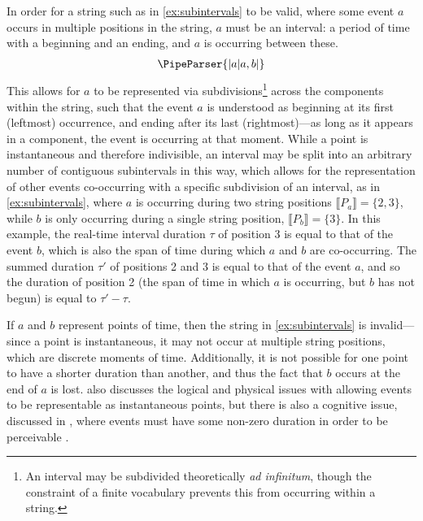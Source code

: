 \documentclass[a4paper,12pt,leqno]{article}
\newcommand{\vph}[1]{\vphantom{#1}}
\newcommand{\ebox}[1]{\fbox{$\vph{'(),}#1$}}
\newcommand{\EventString}[1]{%
	\renewcommand*{\do}[1]{\ebox{##1}}%
	\PipeParser{#1}%
}
\begin{document}
In order for a string such as in \cref{ex:subintervals} to be valid, where some event $a$ occurs in multiple positions in the string, $a$ must be an interval: a period of time with a beginning and an ending, and $a$ is occurring between these.
\begin{align}\label{ex:subintervals}
	\EventString{{}|a|a,b|{}}
\end{align}
This allows for $a$ to be represented via subdivisions\footnote{An interval may be subdivided theoretically \textit{ad infinitum}, though the constraint of a finite vocabulary prevents this from occurring within a string.} across the components within the string, such that the event $a$ is understood as beginning at its first (leftmost) occurrence, and ending after its last (rightmost)---as long as it appears in a component, the event is occurring at that moment. While a point is instantaneous and therefore indivisible, an interval may be split into an arbitrary number of contiguous subintervals in this way, which allows for the representation of other events co-occurring with a specific subdivision of an interval, as in \cref{ex:subintervals}, where $a$ is occurring during two string positions $\llbracket P_a \rrbracket = \{2, 3\}$, while $b$ is only occurring during a single string position, $\llbracket P_b \rrbracket = \{3\}$. In this example, the real-time interval duration $\tau$ of position 3 is equal to that of the event $b$, which is also the span of time during which $a$ and $b$ are co-occurring. The summed duration $\tau'$ of positions 2 and 3 is equal to that of the event $a$, and so the duration of position 2 (the span of time in which $a$ is occurring, but $b$ has not begun) is equal to $\tau' - \tau$.

If $a$ and $b$ represent points of time, then the string in \cref{ex:subintervals} is invalid---since a point is instantaneous, it may not occur at multiple string positions, which are discrete moments of time. Additionally, it is not possible for one point to have a shorter duration than another, and thus the fact that $b$ occurs at the end of $a$ is lost. \citet{allen1983maintaining} also discusses the logical and physical issues with allowing events to be representable as instantaneous points, but there is also a cognitive issue, discussed in \citet{Freksa1992}, where events must have some non-zero duration in order to be perceivable \citep{hamblin1972instants}.
\end{document}
